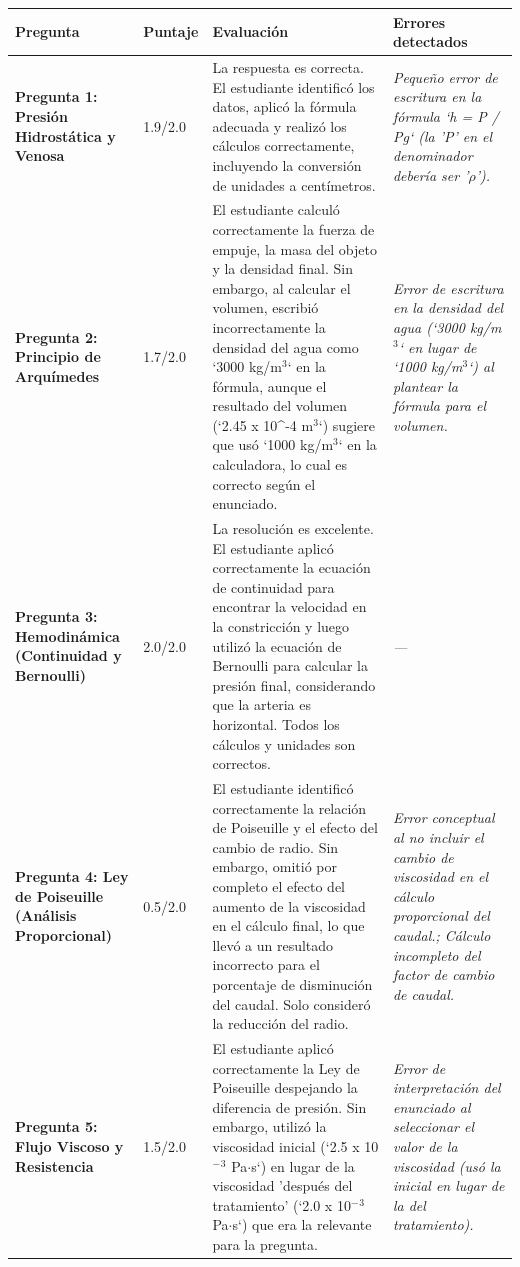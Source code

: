 \documentclass[11pt,a4paper]{article}
\begin{document}
\begin{longtable}{>{\bfseries}p{2.8cm} p{1.6cm} p{7.0cm} p{2.8cm}}
  \toprule
  \textbf{Pregunta} & \textbf{Puntaje} & \textbf{Evaluación} & \textbf{Errores detectados} \\
  \midrule
  \endhead
  \bottomrule
  \endfoot
    \textbf{Pregunta 1: Presión Hidrostática y Venosa} & 1.9/2.0 & La respuesta es correcta. El estudiante identificó los datos, aplicó la fórmula adecuada y realizó los cálculos correctamente, incluyendo la conversión de unidades a centímetros. & \textit{Pequeño error de escritura en la fórmula `h = P / Pg` (la 'P' en el denominador debería ser '$\rho$').} \\
    \midrule
    \textbf{Pregunta 2: Principio de Arquímedes} & 1.7/2.0 & El estudiante calculó correctamente la fuerza de empuje, la masa del objeto y la densidad final. Sin embargo, al calcular el volumen, escribió incorrectamente la densidad del agua como `3000 kg/m$^{3}$` en la fórmula, aunque el resultado del volumen (`2.45 x 10\textasciicircum{}-4 m$^{3}$`) sugiere que usó `1000 kg/m$^{3}$` en la calculadora, lo cual es correcto según el enunciado. & \textit{Error de escritura en la densidad del agua (`3000 kg/m$^{3}$` en lugar de `1000 kg/m$^{3}$`) al plantear la fórmula para el volumen.} \\
    \midrule
    \textbf{Pregunta 3: Hemodinámica (Continuidad y Bernoulli)} & 2.0/2.0 & La resolución es excelente. El estudiante aplicó correctamente la ecuación de continuidad para encontrar la velocidad en la constricción y luego utilizó la ecuación de Bernoulli para calcular la presión final, considerando que la arteria es horizontal. Todos los cálculos y unidades son correctos. & \textit{---} \\
    \midrule
    \textbf{Pregunta 4: Ley de Poiseuille (Análisis Proporcional)} & 0.5/2.0 & El estudiante identificó correctamente la relación de Poiseuille y el efecto del cambio de radio. Sin embargo, omitió por completo el efecto del aumento de la viscosidad en el cálculo final, lo que llevó a un resultado incorrecto para el porcentaje de disminución del caudal. Solo consideró la reducción del radio. & \textit{Error conceptual al no incluir el cambio de viscosidad en el cálculo proporcional del caudal.; Cálculo incompleto del factor de cambio de caudal.} \\
    \midrule
    \textbf{Pregunta 5: Flujo Viscoso y Resistencia} & 1.5/2.0 & El estudiante aplicó correctamente la Ley de Poiseuille despejando la diferencia de presión. Sin embargo, utilizó la viscosidad inicial (`2.5 x 10$^{-}$$^{3}$ Pa$\cdot$s`) en lugar de la viscosidad 'después del tratamiento' (`2.0 x 10$^{-}$$^{3}$ Pa$\cdot$s`) que era la relevante para la pregunta. & \textit{Error de interpretación del enunciado al seleccionar el valor de la viscosidad (usó la inicial en lugar de la del tratamiento).} \\
    \midrule
\end{longtable}
\end{document}
